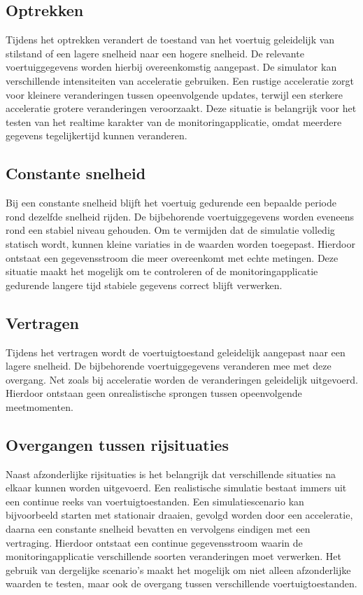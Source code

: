 \subsection{Optrekken}
Tijdens het optrekken verandert de toestand van het voertuig geleidelijk van stilstand of een lagere snelheid naar een hogere snelheid. De relevante voertuiggegevens worden hierbij overeenkomstig aangepast.
De simulator kan verschillende intensiteiten van acceleratie gebruiken. Een rustige acceleratie zorgt voor kleinere veranderingen tussen opeenvolgende updates, terwijl een sterkere acceleratie grotere veranderingen veroorzaakt.
Deze situatie is belangrijk voor het testen van het realtime karakter van de monitoringapplicatie, omdat meerdere gegevens tegelijkertijd kunnen veranderen.

\subsection{Constante snelheid}
Bij een constante snelheid blijft het voertuig gedurende een bepaalde periode rond dezelfde snelheid rijden. De bijbehorende voertuiggegevens worden eveneens rond een stabiel niveau gehouden.
Om te vermijden dat de simulatie volledig statisch wordt, kunnen kleine variaties in de waarden worden toegepast. Hierdoor ontstaat een gegevensstroom die meer overeenkomt met echte metingen.
Deze situatie maakt het mogelijk om te controleren of de monitoringapplicatie gedurende langere tijd stabiele gegevens correct blijft verwerken.

\subsection{Vertragen}
Tijdens het vertragen wordt de voertuigtoestand geleidelijk aangepast naar een lagere snelheid. De bijbehorende voertuiggegevens veranderen mee met deze overgang.
Net zoals bij acceleratie worden de veranderingen geleidelijk uitgevoerd. Hierdoor ontstaan geen onrealistische sprongen tussen opeenvolgende meetmomenten.

\subsection{Overgangen tussen rijsituaties}
Naast afzonderlijke rijsituaties is het belangrijk dat verschillende situaties na elkaar kunnen worden uitgevoerd. Een realistische simulatie bestaat immers uit een continue reeks van voertuigtoestanden.
Een simulatiescenario kan bijvoorbeeld starten met stationair draaien, gevolgd worden door een acceleratie, daarna een constante snelheid bevatten en vervolgens eindigen met een vertraging. Hierdoor ontstaat een continue gegevensstroom waarin de monitoringapplicatie verschillende soorten veranderingen moet verwerken.
Het gebruik van dergelijke scenario's maakt het mogelijk om niet alleen afzonderlijke waarden te testen, maar ook de overgang tussen verschillende voertuigtoestanden.

